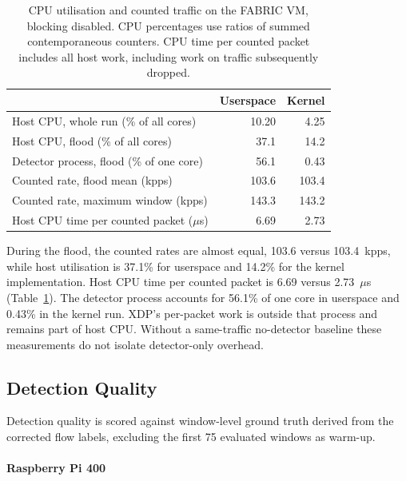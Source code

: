 \begin{table}[H]
  \centering
  \small
  \begin{tabular}{@{}lrr@{}}
    \toprule
    & Userspace & Kernel \\
    \midrule
    Host CPU, whole run (\% of all cores) & 10.20 & 4.25 \\
    Host CPU, flood (\% of all cores) & 37.1 & 14.2 \\
    Detector process, flood (\% of one core) & 56.1 & 0.43 \\
    Counted rate, flood mean (kpps) & 103.6 & 103.4 \\
    Counted rate, maximum window (kpps) & 143.3 & 143.2 \\
    Host CPU time per counted packet ($\mu$s) & 6.69 & 2.73 \\
    \bottomrule
  \end{tabular}
  \caption{CPU utilisation and counted traffic on the FABRIC VM, blocking disabled. CPU percentages use ratios of summed contemporaneous counters. CPU time per counted packet includes all host work, including work on traffic subsequently dropped.}
  \label{tab:fabric-cpu}
\end{table}

During the flood, the counted rates are almost equal, 103.6 versus
103.4~kpps, while host utilisation is 37.1\% for userspace and 14.2\%
for the kernel implementation. Host CPU time per counted packet is
6.69 versus 2.73~$\mu$s (Table~\ref{tab:fabric-cpu}). The detector
process accounts for 56.1\% of one core in userspace and 0.43\% in
the kernel run. XDP's per-packet work is outside that process and remains
part of host CPU. Without a same-traffic no-detector baseline these
measurements do not isolate detector-only overhead.


\subsection{Detection Quality}
\label{sec:res-detection}

Detection quality is scored against window-level ground truth derived from
the corrected flow labels, excluding the first 75 evaluated windows as
warm-up.

\paragraph{Raspberry Pi 400}

